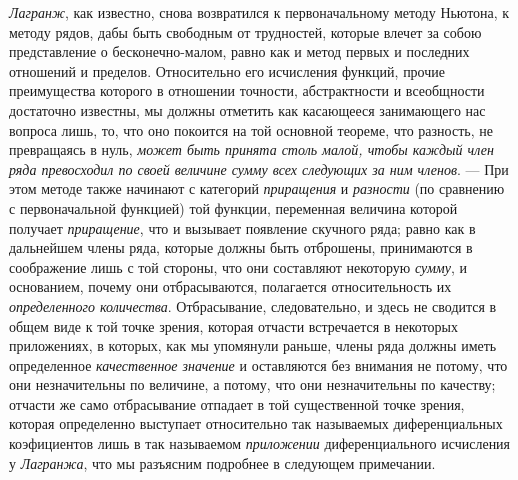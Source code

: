 {{\em Лагранж}, как известно, снова возвратился к
первоначальному методу Ньютона, к методу рядов, дабы быть свободным от
трудностей, которые влечет за собою представление о бесконечно-малом, равно
как и метод первых и последних отношений и пределов. Относительно его
исчисления функций, прочие преимущества которого в отношении точности,
абстрактности и всеобщности достаточно известны, мы должны отметить как
касающееся занимающего нас вопроса лишь, то, что оно покоится на той
основной теореме, что разность, не превращаясь в нуль,
{\em может быть принята столь малой, чтобы каждый член
ряда превосходил по своей величине сумму всех следующих за ним членов}. —
При этом методе также начинают с категорий
{\em приращения} и {\em разности}
(по сравнению с первоначальной функцией) той функции, переменная величина
которой получает {\em приращение}, что и вызывает
появление скучного ряда; равно как в дальнейшем члены ряда, которые должны
быть отброшены, принимаются в соображение лишь с той стороны, что они
составляют некоторую {\em сумму}, и основанием, почему
они отбрасываются, полагается относительность их
{\em определенного количества}. Отбрасывание,
следовательно, и здесь не сводится в общем виде к той точке зрения, которая
отчасти встречается в некоторых приложениях, в которых, как мы упомянули
раньше, члены ряда должны иметь определенное
{\em качественное значение} и оставляются без внимания
не потому, что они незначительны по величине, а потому, что они
незначительны по качеству; отчасти же само отбрасывание отпадает в той
существенной точке зрения, которая определенно выступает относительно так
называемых диференциальных коэфициентов лишь в так называемом
{\em приложении} диференциального исчисления у
{\em Лагранжа}, что мы разъясним подробнее в следующем
примечании.

}
